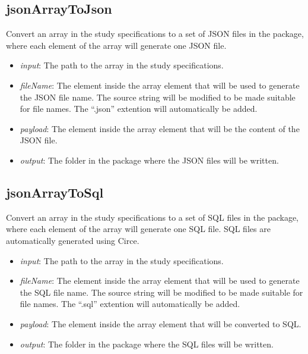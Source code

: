 \documentclass[]{article}
\providecommand{\tightlist}{%
  \setlength{\itemsep}{0pt}\setlength{\parskip}{0pt}}
\begin{document}
\hypertarget{jsonarraytojson}{%
\subsection{jsonArrayToJson}\label{jsonarraytojson}}

Convert an array in the study specifications to a set of JSON files in
the package, where each element of the array will generate one JSON
file.

\begin{itemize}
\tightlist
\item
  \emph{input}: The path to the array in the study specifications.
\item
  \emph{fileName}: The element inside the array element that will be
  used to generate the JSON file name. The source string will be
  modified to be made suitable for file names. The ``.json'' extention
  will automatically be added.
\item
  \emph{payload}: The element inside the array element that will be the
  content of the JSON file.
\item
  \emph{output}: The folder in the package where the JSON files will be
  written.
\end{itemize}

\hypertarget{jsonarraytosql}{%
\subsection{jsonArrayToSql}\label{jsonarraytosql}}

Convert an array in the study specifications to a set of SQL files in
the package, where each element of the array will generate one SQL file.
SQL files are automatically generated using Circe.

\begin{itemize}
\tightlist
\item
  \emph{input}: The path to the array in the study specifications.
\item
  \emph{fileName}: The element inside the array element that will be
  used to generate the SQL file name. The source string will be modified
  to be made suitable for file names. The ``.sql'' extention will
  automatically be added.
\item
  \emph{payload}: The element inside the array element that will be
  converted to SQL.
\item
  \emph{output}: The folder in the package where the SQL files will be
  written.
\end{itemize}
\end{document}
